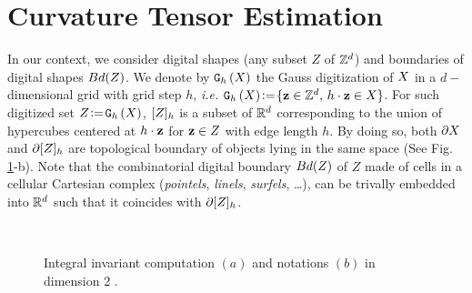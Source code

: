 \documentclass{llncs}
\begin{document}
\section{Curvature Tensor Estimation}
\label{sec:curv-tens-estim}

\sloppy In our context, we consider digital shapes (any subset $Z$ of ${\mathbb{Z}}^d$)
and boundaries of digital shapes $Bd(Z)$. We denote by $\mathtt{G}_{h}\left(X\right)$ the
Gauss digitization of $X$ in a $d-$dimensional grid with grid step $h$,
\emph{i.e.}  $\mathtt{G}_{h}\left(X\right) \!\mathrel{\mathop:}=\! \{ \mathbf{z} \in {\mathbb{Z}}^d,\, h\cdot\mathbf{z}\in X\}$. For such
digitized set $Z\!\mathrel{\mathop:}=\!\mathtt{G}_{h}\left(X\right)$, $\lbrack Z \rbrack_{h}$ is a subset of ${\mathbb{R}}^d$
corresponding to the union of hypercubes centered at $h\cdot \mathbf{z}$ for $\mathbf{z}\in Z$
with edge length $h$. By doing so, both $\partial X$ and
$\partial\lbrack Z \rbrack_{h}$ are topological boundary of objects lying in the same
space (See Fig. \ref{fig:notations}-b). Note that the combinatorial digital
boundary $Bd(Z)$ of $Z$ made of cells in a cellular Cartesian complex
(\emph{pointels}, \emph{linels}, \emph{surfels}, \ldots), can be trivally
embedded into ${\mathbb{R}}^d$ such that it coincides with $\partial\lbrack Z \rbrack_{h}$.


\begin{figure}[t]{\small
    \begin{center}
      ~~~~~~
      \vspace{-0.4cm}
    \end{center}}
    \caption{Integral invariant computation $(a)$ and
      notations $(b)$ in dimension 2 \cite{CVIU2014}.\label{fig:notations}}
\end{figure}
\end{document}
